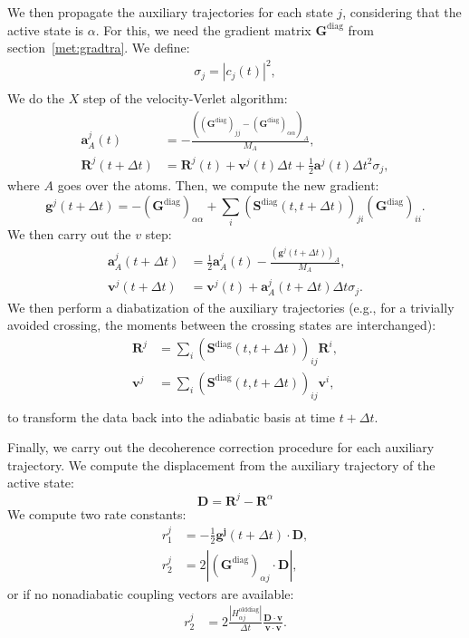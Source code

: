 \documentclass[a4paper,10pt,DIV=15,openany,twoside=false]{scrbook}
\newcommand{\VEC}[1]{\ensuremath{\mathbf{#1}}}
\begin{document}
We then propagate the auxiliary trajectories for each state $j$, considering that the active state is $\alpha$.
For this, we need the gradient matrix $\VEC{G}^\text{diag}$ from section~\ref{met:gradtra}.
We define:
\begin{align}
  \sigma_j=|c_j(t)|^2,\\
\end{align}
We do the $X$ step of the velocity-Verlet algorithm:
\begin{align}
  \VEC{a}^j_A(t)&=-\frac{((\VEC{G}^\text{diag})_{jj}-(\VEC{G}^\text{diag})_{\alpha\alpha})_A}{M_A},\\
  \VEC{R}^j(t+\Delta t)&= \VEC{R}^j(t)+\VEC{v}^j(t)\Delta t +\frac{1}{2}\VEC{a}^j(t)\Delta t^2\sigma_j,
\end{align}
where $A$ goes over the atoms.
Then, we compute the new gradient:
\begin{equation}
  \VEC{g}^j(t+\Delta t)=
  -(\VEC{G}^\text{diag})_{\alpha\alpha}
  +
  \sum_i(\VEC{S}^\text{diag}(t,t+\Delta t))_{ji}(\VEC{G}^\text{diag})_{ii}.
\end{equation}
We then carry out the $v$ step:
\begin{align}
  \VEC{a}^j_A(t+\Delta t)&=\frac{1}{2}\VEC{a}^j_A(t)
  -\frac{(\VEC{g}^j(t+\Delta t))_A}{M_A},\\
  \VEC{v}^j(t+\Delta t)&=\VEC{v}^j(t)+\VEC{a}^j_A(t+\Delta t)\Delta t\sigma_j.
\end{align}
We then perform a diabatization of the auxiliary trajectories (e.g., for a trivially avoided crossing, the moments between the crossing states are interchanged):
\begin{align}
  \VEC{R}^j&=\sum_i(\VEC{S}^\text{diag}(t,t+\Delta t))_{ij}\VEC{R}^i,\\
  \VEC{v}^j&=\sum_i(\VEC{S}^\text{diag}(t,t+\Delta t))_{ij}\VEC{v}^i,\\
\end{align}
to transform the data back into the adiabatic basis at time $t+\Delta t$.

Finally, we carry out the decoherence correction procedure for each auxiliary trajectory.
We compute the displacement from the auxiliary trajectory of the active state:
\begin{equation}
  \VEC{D}=\VEC{R}^j-\VEC{R}^\alpha
\end{equation}
We compute two rate constants:
\begin{align}
  r_1^j&=-\frac{1}{2}\VEC{g^j}(t+\Delta t)\cdot\VEC{D},\\
  r_2^j&=2|(\VEC{G}^\text{diag})_{\alpha j}\cdot\VEC{D}|,
\end{align}
or if no nonadiabatic coupling vectors are available:
\begin{align}
  r_2^j&=2\frac{|H^\text{olddiag}_{\alpha j}|}{\Delta t}\frac{\VEC{D}\cdot\VEC{v}}{\VEC{v}\cdot\VEC{v}}.
\end{align}
\end{document}
